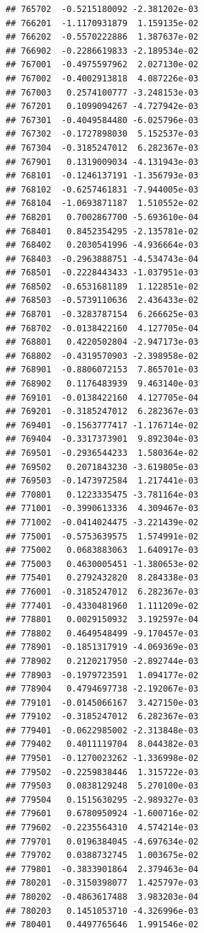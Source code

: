 \documentclass[ignorenonframetext,]{beamer}
\begin{document}
\begin{frame}[fragile]
\begin{verbatim}
## 765702  -0.5215180092 -2.381202e-03
## 766201  -1.1170931879  1.159135e-02
## 766202  -0.5570222886  1.387637e-02
## 766902  -0.2286619833 -2.189534e-02
## 767001  -0.4975597962  2.027130e-02
## 767002  -0.4002913818  4.087226e-03
## 767003   0.2574100777 -3.248153e-03
## 767201   0.1099094267 -4.727942e-03
## 767301  -0.4049584480 -6.025796e-03
## 767302  -0.1727898030  5.152537e-03
## 767304  -0.3185247012  6.282367e-03
## 767901   0.1319009034 -4.131943e-03
## 768101  -0.1246137191 -1.356793e-03
## 768102  -0.6257461831 -7.944005e-03
## 768104  -1.0693871187  1.510552e-02
## 768201   0.7002867700 -5.693610e-04
## 768401   0.8452354295 -2.135781e-02
## 768402   0.2030541996 -4.936664e-03
## 768403  -0.2963888751 -4.534743e-04
## 768501  -0.2228443433 -1.037951e-03
## 768502  -0.6531681189  1.122851e-02
## 768503  -0.5739110636  2.436433e-02
## 768701  -0.3283787154  6.266625e-03
## 768702  -0.0138422160  4.127705e-04
## 768801   0.4220502804 -2.947173e-03
## 768802  -0.4319570903 -2.398958e-02
## 768901  -0.8806072153  7.865701e-03
## 768902   0.1176483939  9.463140e-03
## 769101  -0.0138422160  4.127705e-04
## 769201  -0.3185247012  6.282367e-03
## 769401  -0.1563777417 -1.176714e-02
## 769404  -0.3317373901  9.892304e-03
## 769501  -0.2936544233  1.580364e-02
## 769502   0.2071843230 -3.619805e-03
## 769503  -0.1473972584  1.217441e-03
## 770801   0.1223335475 -3.781164e-03
## 771001  -0.3990613336  4.309467e-03
## 771002  -0.0414024475 -3.221439e-02
## 775001  -0.5753639575  1.574991e-02
## 775002   0.0683883063  1.640917e-03
## 775003   0.4630005451 -1.380653e-02
## 775401   0.2792432820  8.284338e-03
## 776001  -0.3185247012  6.282367e-03
## 777401  -0.4330481960  1.111209e-02
## 778801   0.0029150932  3.192597e-04
## 778802   0.4649548499 -9.170457e-03
## 778901  -0.1851317919 -4.069369e-03
## 778902   0.2120217950 -2.892744e-03
## 778903  -0.1979723591  1.094177e-02
## 778904   0.4794697738 -2.192067e-03
## 779101  -0.0145066167  3.427150e-03
## 779102  -0.3185247012  6.282367e-03
## 779401  -0.0622985002 -2.313848e-03
## 779402   0.4011119704  8.044382e-03
## 779501  -0.1270023262 -1.336998e-02
## 779502  -0.2259838446  1.315722e-03
## 779503   0.0838129248  5.270100e-03
## 779504   0.1515630295 -2.989327e-03
## 779601   0.6780950924 -1.600716e-02
## 779602  -0.2235564310  4.574214e-03
## 779701   0.0196384045 -4.697634e-02
## 779702   0.0388732745  1.003675e-02
## 779801  -0.3833901864  2.379463e-04
## 780201  -0.3150398077  1.425797e-03
## 780202  -0.4863617488  3.983203e-04
## 780203   0.1451053710 -4.326996e-03
## 780401   0.4497765646  1.991546e-02

\end{verbatim}
\end{frame}
\end{document}
